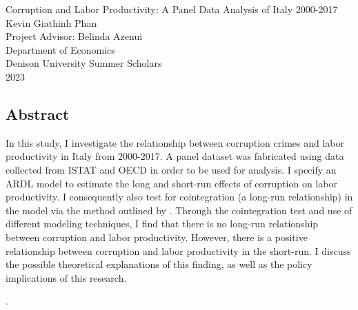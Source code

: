 \documentclass[12pt]{article} %
\begin{document}
\pagestyle{fancy}
\fancyhf{} %
\renewcommand{\headrulewidth}{0pt}
\fancyfoot{}

\begin{titlepage} %
	\hfill \break 
	\hfill \break
	\hfill \break
	\hfill \break
	\hfill \break
	\hfill \break
	\begin{center}
			Corruption and Labor Productivity: A Panel Data Analysis of Italy 2000-2017 \\	
			\hfill \break 
			\hfill \break
			\hfill \break
			\hfill \break
			Kevin Giathinh Phan \\
			\hfill \break 
			\hfill \break
			\hfill \break
			\hfill \break	
			Project Advisor: Belinda Azenui \\
			\hfill \break	
			Department of Economics\\
			\hfill \break
			\hfill \break
			\hfill \break	
			Denison University Summer Scholars\\
			2023
		\end{center}

\end{titlepage}

\newpage
\begin{center}
	\section*{Abstract}
\end{center}
\doublespacing %

		In this study, I investigate the relationship between corruption crimes and labor productivity in Italy from 2000-2017. A panel dataset was fabricated using data collected from ISTAT and OECD in order to be used for analysis. I specify an ARDL model to estimate the long and short-run effects of corruption on labor productivity. I consequently also test for cointegration (a long-run relationship) in the model via the method outlined by \citet{pesaran_bounds_2001}. Through the cointegration test and use of different modeling techniques, I find that there is no long-run relationship between corruption and labor productivity. However, there is a positive relationship between corruption and labor productivity in the short-run. I discuss the possible theoretical explanations of this finding, as well as the policy implications of this research.

\let\thefootnote\relax{}.
\end{document}
